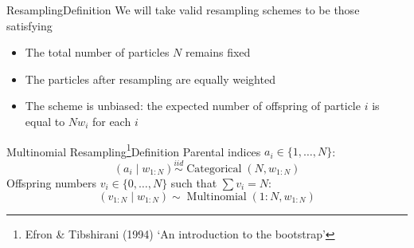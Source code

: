 \documentclass[aspectratio=169]{beamer}
\theoremstyle{definition}
\newcommand{\E}{\mathbb{E}}
\newcommand{\Cat}{\operatorname{Categorical}}
\newcommand{\Mn}{\operatorname{Multinomial}}
\newcommand{\vt}[1]{v_{#1}}
\newcommand{\wt}[1]{w_{#1}}
\begin{document}
\begin{frame}{Resampling}{Definition}
%
We will take valid resampling schemes to be those satisfying
\begin{itemize}
\item The total number of particles $N$ remains fixed
\item The particles after resampling are equally weighted
\item The scheme is unbiased: the expected number of offspring of particle $i$ is equal to $N\wt{i}$ for each $i$
\end{itemize}

\end{frame}


\begin{frame}{Multinomial Resampling\footnote{Efron \& Tibshirani (1994) `An introduction to the bootstrap'}}{Definition}
Parental indices $a_i \in \{1,\dots,N\}$:
\begin{equation*}
(a_{i} \mid \wt{1:N}) \overset{iid}{\sim} \Cat(N, \wt{1:N})
\end{equation*}
Offspring numbers $\vt{i} \in \{0,\dots,N\}$ such that $\sum \vt{i} = N$:
\begin{equation*}
(\vt{1:N} \mid \wt{1:N}) \sim \Mn(1:N, \wt{1:N})
\end{equation*}

\end{frame}
\end{document}
